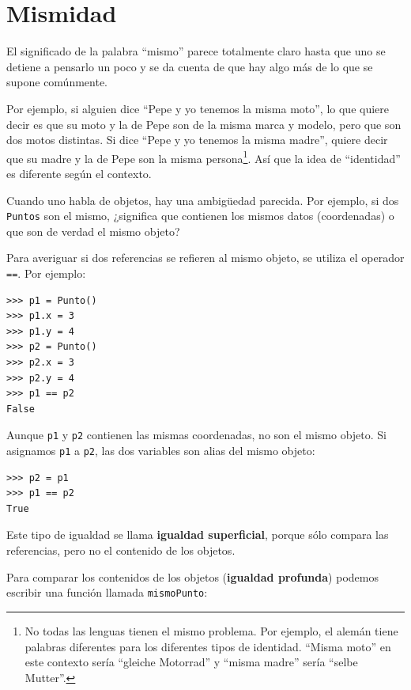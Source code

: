 \section{Mismidad}


El significado de la palabra ``mismo'' parece totalmente claro hasta
que uno se detiene a pensarlo un poco y se da cuenta de que hay algo
más de lo que se supone comúnmente.

  

Por ejemplo, si alguien dice ``Pepe y yo tenemos la misma moto'',
lo que quiere decir es que su moto y la de Pepe son de la misma marca
y modelo, pero que son dos motos distintas. Si dice ``Pepe y yo tenemos
la misma madre'', quiere decir que su madre y la de Pepe son la misma
persona\footnote{No todas las lenguas tienen el mismo problema. Por ejemplo, el alemán
tiene palabras diferentes para los diferentes tipos de identidad.
``Misma moto'' en este contexto sería ``gleiche Motorrad'' y ``misma
madre'' sería ``selbe Mutter''.}. Así que la idea de ``identidad'' es diferente según el contexto.

Cuando uno habla de objetos, hay una ambigüedad parecida. Por ejemplo,
si dos \texttt{Puntos} son el mismo, ¿significa que contienen los
mismos datos (coordenadas) o que son de verdad el mismo objeto?

Para averiguar si dos referencias se refieren al mismo objeto, se
utiliza el operador \texttt{==}. Por ejemplo:
\begin{verbatim}
>>> p1 = Punto()
>>> p1.x = 3
>>> p1.y = 4
>>> p2 = Punto()
>>> p2.x = 3
>>> p2.y = 4
>>> p1 == p2
False
\end{verbatim}

Aunque \texttt{p1} y \texttt{p2} contienen las mismas coordenadas,
no son el mismo objeto. Si asignamos \texttt{p1} a \texttt{p2}, las
dos variables son alias del mismo objeto:
\begin{verbatim}
>>> p2 = p1
>>> p1 == p2
True
\end{verbatim}

Este tipo de igualdad se llama \textbf{igualdad superficial}, porque
sólo compara las referencias, pero no el contenido de los objetos.

  

Para comparar los contenidos de los objetos (\textbf{igualdad profunda})
podemos escribir una función llamada \texttt{mismoPunto}:

